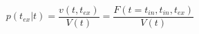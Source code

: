 \begin{equation}
p(t_{ex}|t)  = \frac{v(t,t_{ex})}{V(t)}= \frac{F(t=t_{in},t_{in},t_{ex})}{V(t)}
\end{equation}